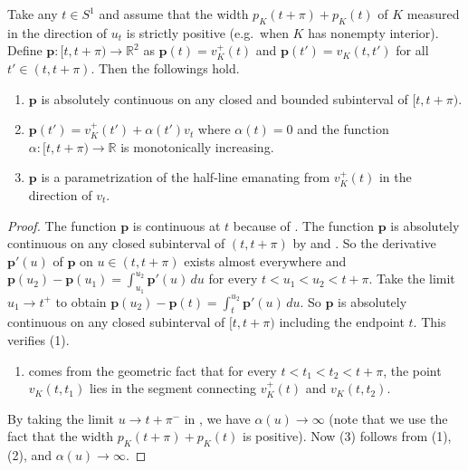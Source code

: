 \begin{theorem}

Take any \(t \in S^1\) and assume that the width \(p_K(t + \pi) + p_K(t)\) of \(K\) measured in the direction of \(u_t\) is strictly positive (e.g.~when \(K\) has nonempty interior). Define \(\mathbf{p} : [t, t + \pi) \to \mathbb{R}^2\) as \(\mathbf{p}(t) = v_K^+(t)\) and \(\mathbf{p}(t') = v_K(t, t')\) for all \(t' \in (t, t + \pi)\). Then the followings hold.

\begin{enumerate}
\def\labelenumi{\arabic{enumi}.}
\tightlist
\item
  \(\mathbf{p}\) is absolutely continuous on any closed and bounded subinterval of \([t, t+ \pi)\).
\item
  \(\mathbf{p}(t') = v_K^+(t') + \alpha(t') v_t\) where \(\alpha(t) = 0\) and the function \(\alpha : [t, t + \pi) \to \mathbb{R}\) is monotonically increasing.
\item
  \(\mathbf{p}\) is a parametrization of the half-line emanating from \(v_K^+(t)\) in the direction of \(v_t\).
\end{enumerate}

\label{thm:tangent-line-parametrization}
\end{theorem}

\begin{proof}
The function \(\mathbf{p}\) is continuous at \(t\) because of . The function \(\mathbf{p}\) is absolutely continuous on any closed subinterval of \((t, t+ \pi)\) by  and . So the derivative \(\mathbf{p}'(u)\) of \(\mathbf{p}\) on \(u \in (t, t + \pi)\) exists almost everywhere and \(\mathbf{p}(u_2) - \mathbf{p}(u_1) = \int_{u_1}^{u_2} \mathbf{p}'(u) \, du\) for every \(t < u_1 < u_2 < t + \pi\). Take the limit \(u_1 \to t^+\) to obtain \(\mathbf{p}(u_2) - \mathbf{p}(t) = \int_{t}^{u_2} \mathbf{p}'(u)\,du\). So \(\mathbf{p}\) is absolutely continuous on any closed subinterval of \([t, t + \pi)\) including the endpoint \(t\). This verifies (1).

\begin{enumerate}
\def\labelenumi{(\arabic{enumi})}
\tightlist
\item
  comes from the geometric fact that for every \(t < t_1 < t_2 < t + \pi\), the point \(v_K(t, t_1)\) lies in the segment connecting \(v_K^+(t)\) and \(v_K(t, t_2)\).
\end{enumerate}

By taking the limit \(u \to t + \pi^-\) in , we have \(\alpha(u) \to \infty\) (note that we use the fact that the width \(p_K(t + \pi) + p_K(t)\) is positive). Now (3) follows from (1), (2), and \(\alpha(u) \to \infty\).
\end{proof}

